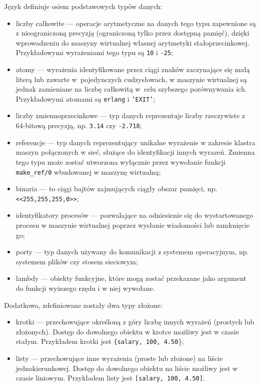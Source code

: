Język definiuje osiem podstawowych typów danych:
\begin{itemize}
\item liczby całkowite --- operacje arytmetyczne na danych tego typu zapewnione są z nieograniczoną precyzją (ograniczoną tylko przez dostępną pamięć), dzięki wprowadzeniu do maszyny wirtualnej własnej arytmetyki stałoprzecinkowej. Przykładowymi wyrażeniami tego typu są \texttt{10} i \texttt{-25};
\item atomy --- wyrażenia identyfikowane przez ciągi znaków zaczynające się małą literą lub zawarte w~pojedynczych cudzysłowach, w maszynie wirtualnej są jednak zamieniane na liczbę całkowitą w~celu szybszego porównywania ich. Przykładowymi atomami są \texttt{erlang} i \texttt{'EXIT'};
\item liczby zmiennoprzecinkowe --- typ danych reprezentuje liczby rzeczywiste z 64-bitową precyzją, np. \texttt{3.14} czy \texttt{-2.718};
\item referencje --- typ danych reprezentujący unikalne wyrażenie w zakresie klastra maszyn połączonych w sieć, służące do identyfikacji innych wyrazeń. Zmienna tego typu może zostać utworzona wyłącznie przez wywołanie funkcji \texttt{make\_ref/0} wbudowanej w maszynę wirtualną;
\item binaria --- to ciągi bajtów zajmujących ciągły obszar pamięci, np. \texttt{<<255,255,255,0>>}; 
\item identyfikatory procesów --- pozwalające na odniesienie się do wystartowanego procesu w maszynie wirtualnej poprzez wysłanie wiadomości lub zamknięcie go;
\item porty --- typ danych używany do komunikacji z systemem operacyjnym, np. systemem plików czy stosem sieciowym;
\item lambdy --- obiekty funkcyjne, które mogą zostać przekazane jako argument do funkcji wyższego rzędu i w niej wywołane.
\end{itemize}

Dodatkowo, zdefiniowane zostały dwa typy złożone:
\begin{itemize}
\item krotki --- przechowujące określoną z góry liczbę innych wyrażeń (prostych lub złożonych). Dostęp do dowolnego obiektu w krotce możliwy jest w czasie stałym. Przykładem krotki jest \texttt{\{salary, 100, 4.50}\};
\item listy --- przechowujące inne wyrażenia (proste lub złożone) na liście jednokierunkowej. Dostęp do dowolnego obiektu na liście możliwy jest w czasie liniowym. Przykładem listy jest \texttt{[salary, 100, 4.50]}.
\end{itemize}

